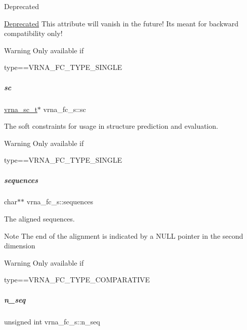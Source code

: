 \begin{DoxyRefDesc}{Deprecated}
\item[\mbox{\hyperlink{deprecated__deprecated000079}{Deprecated}}]This attribute will vanish in the future! It\textquotesingle{}s meant for backward compatibility only! \end{DoxyRefDesc}
\begin{DoxyWarning}{Warning}
Only available if\begin{DoxyVerb}type==VRNA_FC_TYPE_SINGLE \end{DoxyVerb}
 
\end{DoxyWarning}
\mbox{\label{group__fold__compound_ac7089e90460ad3990a308808c8044c9f}} 
\subparagraph{\texorpdfstring{sc}{sc}}
{\footnotesize\ttfamily \mbox{\hyperlink{group__soft__constraints_ga75401ce219ef8dbcceb672db82d434c6}{vrna\+\_\+sc\+\_\+t}}$\ast$ vrna\+\_\+fc\+\_\+s\+::sc}



The soft constraints for usage in structure prediction and evaluation. 

\begin{DoxyWarning}{Warning}
Only available if\begin{DoxyVerb}type==VRNA_FC_TYPE_SINGLE \end{DoxyVerb}
 
\end{DoxyWarning}
\mbox{\label{group__fold__compound_a965dbb42f2e13cace5aa3bbab4396530}} 
\subparagraph{\texorpdfstring{sequences}{sequences}}
{\footnotesize\ttfamily char$\ast$$\ast$ vrna\+\_\+fc\+\_\+s\+::sequences}



The aligned sequences. 

\begin{DoxyNote}{Note}
The end of the alignment is indicated by a N\+U\+LL pointer in the second dimension 
\end{DoxyNote}
\begin{DoxyWarning}{Warning}
Only available if\begin{DoxyVerb}type==VRNA_FC_TYPE_COMPARATIVE \end{DoxyVerb}
 
\end{DoxyWarning}
\mbox{\label{group__fold__compound_a614702ab74478e786272be44f8cebfe3}} 
\subparagraph{\texorpdfstring{n\_seq}{n\_seq}}
{\footnotesize\ttfamily unsigned int vrna\+\_\+fc\+\_\+s\+::n\+\_\+seq}



